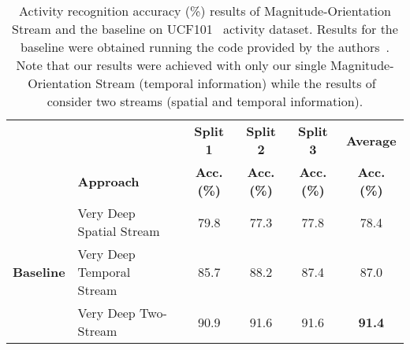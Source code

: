 \documentclass[10pt,conference]{IEEEtran}
\begin{document}
\begin{table*}[th!]
	\centering
	\begin{small}
		\caption{Activity recognition accuracy (\%) results of Magnitude-Orientation Stream and the baseline on UCF101~\cite{Soomro:2012} activity dataset. Results for the baseline were obtained running the code provided by the authors~\cite{Wang:2015}. Note that our results were achieved with only our single Magnitude-Orientation Stream (temporal information) while the results of~\cite{Wang:2015} consider two streams (spatial and temporal information).}
		\begin{tabular}{clp{1.5cm}p{1.5cm}p{1.5cm}p{1.5cm}}
			\toprule
			& & \multicolumn{1}{c}{\textbf{Split 1}} & \multicolumn{1}{c}{\textbf{Split 2}} & \multicolumn{1}{c}{\textbf{Split 3}} & \multicolumn{1}{c}{\textbf{Average}}\vspace{0.075cm}\\
			& \textbf{Approach} & \multicolumn{1}{c}{\textbf{Acc. (\%)}} & \multicolumn{1}{c}{\textbf{Acc. (\%)}} & \multicolumn{1}{c}{\textbf{Acc. (\%)}} & \multicolumn{1}{c}{\textbf{Acc. (\%)}}\\
			\toprule
			& Very Deep Spatial Stream~\cite{Wang:2015} & \multicolumn{1}{c}{79.8} & \multicolumn{1}{c}{77.3} & \multicolumn{1}{c}{77.8} & \multicolumn{1}{c}{78.4} \\
			\multirow{1}{*}{\textbf{Baseline}} & Very Deep Temporal Stream~\cite{Wang:2015} & \multicolumn{1}{c}{85.7} & \multicolumn{1}{c}{88.2} & \multicolumn{1}{c}{87.4} & \multicolumn{1}{c}{87.0} \\ 
			& Very Deep Two-Stream~\cite{Wang:2015} & \multicolumn{1}{c}{90.9} & \multicolumn{1}{c}{91.6} & \multicolumn{1}{c}{91.6} & \multicolumn{1}{c}{\textbf{91.4}} \\
			\midrule
			

\end{tabular}
\end{small}
\end{table*}
\end{document}

